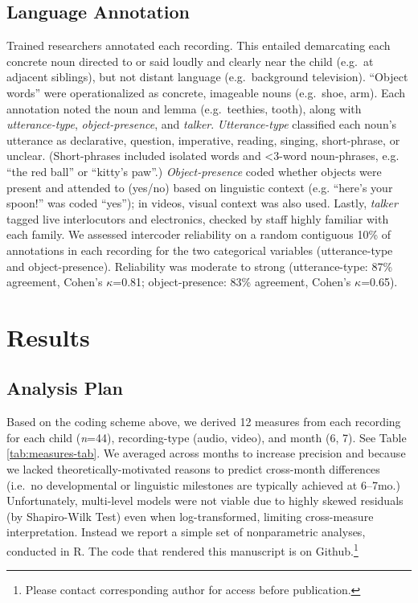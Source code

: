 \documentclass[man]{apa6}
\theoremstyle{definition}
\theoremstyle{definition}
\theoremstyle{definition}
\theoremstyle{remark}
\begin{document}
\subsection{Language Annotation}\label{language-annotation}

Trained researchers annotated each recording. This entailed demarcating
each concrete noun directed to or said loudly and clearly near the child
(e.g.~at adjacent siblings), but not distant language (e.g.~background
television). \enquote{Object words} were operationalized as concrete,
imageable nouns (e.g.~shoe, arm). Each annotation noted the noun and
lemma (e.g.~teethies, tooth), along with \emph{utterance-type},
\emph{object-presence}, and \emph{talker}. \emph{Utterance-type}
classified each noun's utterance as declarative, question, imperative,
reading, singing, short-phrase, or unclear. (Short-phrases included
isolated words and \textless{}3-word noun-phrases, e.g. \enquote{the red
ball} or \enquote{kitty's paw}.) \emph{Object-presence} coded whether
objects were present and attended to (yes/no) based on linguistic
context (e.g. \enquote{here's your spoon!} was coded \enquote{yes}); in
videos, visual context was also used. Lastly, \emph{talker} tagged live
interlocutors and electronics, checked by staff highly familiar with
each family. We assessed intercoder reliability on a random contiguous
10\% of annotations in each recording for the two categorical variables
(utterance-type and object-presence). Reliability was moderate to strong
(utterance-type: 87\% agreement, Cohen's \(\kappa\)=0.81;
object-presence: 83\% agreement, Cohen's \(\kappa\)=0.65).

\section{Results}\label{results}

\subsection{Analysis Plan}\label{analysis-plan}

Based on the coding scheme above, we derived 12 measures from each
recording for each child (\emph{n}=44), recording-type (audio, video),
and month (6, 7). See Table \ref{tab:measures-tab}. We averaged across
months to increase precision and because we lacked
theoretically-motivated reasons to predict cross-month differences
(i.e.~no developmental or linguistic milestones are typically achieved
at 6--7mo.) Unfortunately, multi-level models were not viable due to
highly skewed residuals (by Shapiro-Wilk Test) even when
log-transformed, limiting cross-measure interpretation. Instead we
report a simple set of nonparametric analyses, conducted in R. The code
that rendered this manuscript is on
Github.\footnote{Please contact corresponding author for access before publication.}
\end{document}
